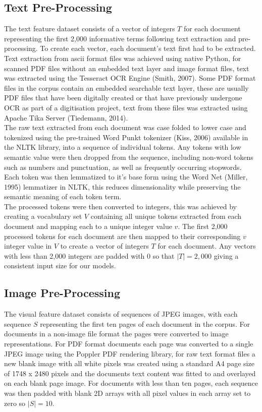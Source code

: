 \documentclass[a4paper,12pt]{article}
\begin{document}
\subsection{Text Pre-Processing}
The text feature dataset consists of a vector of integers $T$ for each document representing the first 2,000 informative terms following text extraction and pre-processing. To create each vector, each document's text first had to be extracted. Text extraction from ascii format files was achieved using native Python, for scanned PDF files without an embedded text layer and image format files, text was extracted using the Tesseract OCR Engine (Smith, 2007). Some PDF format files in the corpus contain an embedded searchable text layer, these are usually PDF files that have been digitally created or that have previously undergone OCR as part of a digitisation project, text from these files was extracted using Apache Tika Server (Tiedemann, 2014).  \\

The raw text extracted from each document was case folded to lower case and tokenized using the pre-trained Word Punkt tokenizer (Kiss, 2006) available in the NLTK library, into a sequence of individual tokens. Any tokens with low semantic value were then dropped from the sequence, including non-word tokens such as numbers and punctuation, as well as frequently occurring stopwords. Each token was then lemmatized to it's base form using the Word Net (Miller, 1995) lemmatizer in NLTK, this reduces dimensionality while preserving the semantic meaning of each token term.\\

The processed tokens were then converted to integers, this was achieved by creating a vocabulary set $V$ containing all unique tokens extracted from each document and mapping each to a unique integer value $v$. The first 2,000 processed tokens for each document are then mapped to their corresponding $v$ integer value in $V$ to create a vector of integers $T$ for each document. Any vectors with less than 2,000 integers are padded with 0 so that $|T| = 2,000$ giving a consistent input size for our models.\\

\subsection{Image Pre-Processing}
The visual feature dataset consists of sequences of JPEG images, with each sequence $S$ representing the first ten pages of each document in the corpus. For documents in a non-image file format the pages were converted to image representations. For PDF format documents each page was converted to a single JPEG image using the Poppler PDF rendering library, for raw text format files a new blank image with all white pixels was created using a standard A4 page size of 1748 x 2480 pixels and the documents text content was fitted to and overlayed on each blank page image. For documents with less than ten pages, each sequence was then padded with blank 2D arrays with all pixel values in each array set to zero so $|S| = 10$. \\
\end{document}

